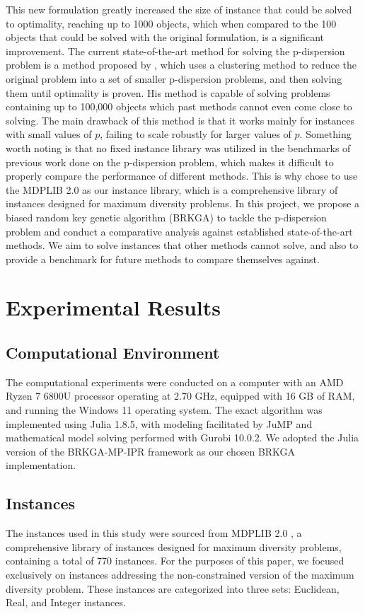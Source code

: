 \documentclass[preprint,12pt]{elsarticle}
\begin{document}
This new formulation greatly increased the size of instance that could be solved to optimality, reaching up to 1000 objects, which when compared to the 100 objects that could be solved with the original formulation, is a significant improvement.
The current state-of-the-art method for solving the p-dispersion problem is a method proposed by \citet{Contardo2020-vn}, which uses a clustering method to reduce the original problem into a set of smaller p-dispersion problems, and then solving them
until optimality is proven. His method is capable of solving problems containing up to 100,000 objects which past methods cannot even come close to solving. The main drawback of this method is that it works mainly for instances with small values of $p$,
failing to scale robustly for larger values of $p$. Something worth noting is that no fixed instance library was utilized in the benchmarks of previous work done on the p-dispersion problem, 
which makes it difficult to properly compare the performance of different methods. This is why chose to use the MDPLIB 2.0 \citet{marti2021mdplib} as our instance library, which is a comprehensive library of instances designed for maximum diversity problems.
In this project, we propose a biased random key genetic algorithm (BRKGA) \citet{Goncalves2011-kp} to tackle the p-dispersion problem and conduct a comparative analysis against established state-of-the-art methods. We aim to solve instances that other methods
cannot solve, and also to provide a benchmark for future methods to compare themselves against.
\section{Experimental Results}
\subsection{Computational Environment}
The computational experiments were conducted on a computer with an AMD Ryzen 7 6800U processor operating at 2.70 GHz, equipped with 16 GB of RAM, and running the Windows 11 operating system. The exact algorithm was implemented using Julia 1.8.5, with modeling facilitated by JuMP \citet{Lubin2023} and mathematical model solving performed with Gurobi 10.0.2. We adopted the Julia version of the BRKGA-MP-IPR framework \citet{Andrade2021-pe} as our chosen BRKGA implementation.

\subsection{Instances}
The instances used in this study were sourced from MDPLIB 2.0 \citet{marti2021mdplib}, a comprehensive library of instances designed for maximum diversity problems, containing a total of 770 instances. For the purposes of this paper, we focused exclusively on instances addressing the non-constrained version of the maximum diversity problem. These instances are categorized into three sets: Euclidean, Real, and Integer instances.
\end{document}

